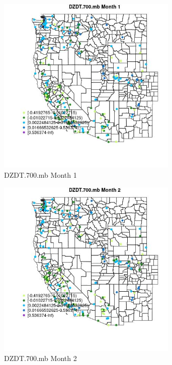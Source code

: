 \begin{figure} 
\centering  
\includegraphics[width=0.77\textwidth]{Code_Outputs/Report_ML_input_PM25_Step4_part_e_de_duplicated_aveswNAs_MapObsMo1DZDT700mb.jpg} 
\caption{\label{fig:Report_ML_input_PM25_Step4_part_e_de_duplicated_aveswNAsMapObsMo1DZDT700mb}DZDT.700.mb Month 1} 
\end{figure} 
 

\begin{figure} 
\centering  
\includegraphics[width=0.77\textwidth]{Code_Outputs/Report_ML_input_PM25_Step4_part_e_de_duplicated_aveswNAs_MapObsMo2DZDT700mb.jpg} 
\caption{\label{fig:Report_ML_input_PM25_Step4_part_e_de_duplicated_aveswNAsMapObsMo2DZDT700mb}DZDT.700.mb Month 2} 
\end{figure} 
 

